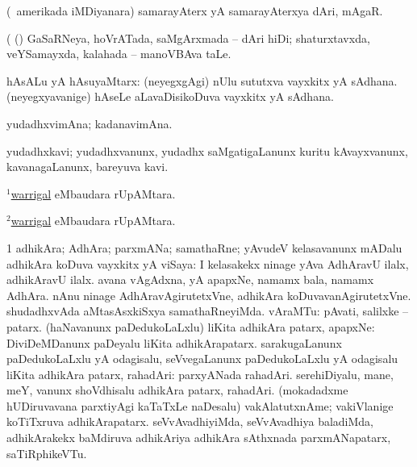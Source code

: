 \bentry
{} 
\gl{\nA}
\expl{}
\bmng
(\kanu\ amerikada iMDiyanara) samarayAterx yA samarayAterxya dAri, mAgaR. 
\emng

\noindent 
\gl{\pagu}
\expl{}
\bmng
{} (  (\rUpa) GaSaRNeya, hoVrATada, saMgArxmada -- dAri hiDi; shaturxtavxda, veYSamayxda, kalahada -- manoVBAva taLe. 
\emng
\eentry

\bentry
{} 
\gl{\nA}
\expl{}
\bmng
hAsALu yA hAsuyaMtarx: 
\banum
{} (neyegxgAgi) nUlu sututxva vayxkitx yA sAdhana. 
 (neyegxyavanige) hAseLe aLavaDisikoDuva vayxkitx yA sAdhana. 
\eanum
\emng
\eentry

\bentry
{} 
\gl{\nA}
\expl{}
\bmng
yudadhxvimAna; kadanavimAna. 
\emng
\eentry

\bentry
{} 
\gl{\nA}
\expl{}
\bmng
yudadhxkavi; yudadhxvanunx, yudadhx saMgatigaLanunx kuritu kAvayxvanunx, kavanagaLanunx, bareyuva kavi. 
\emng
\eentry

\bentry
{} 
\gl{\nA}
\expl{}
\bmng
\hyperlink{warrigal(1)}{$^1$warrigal} eMbaudara rUpAMtara. 
\emng
\eentry

\bentry
{} 
\gl{\gu}
\expl{}
\bmng
\hyperlink{warrigal(2)}{$^2$warrigal} eMbaudara rUpAMtara. 
\emng
\eentry

\bentry
{} 
\gl{\nA}
\expl{}
\bmng
\bnum
\num{1} adhikAra; AdhAra; parxmANa; samathaRne; yAvudeV kelasavanunx mADalu adhikAra koDuva vayxkitx yA viSaya:  I kelasakekx ninage yAva AdhAravU ilalx, adhikAravU ilalx.  avana vAgAdxna, yA apapxNe, namamx bala, namamx AdhAra.  nAnu ninage AdhAravAgirutetxVne, adhikAra koDuvavanAgirutetxVne.  shudadhxvAda aMtasAsxkiSxya samathaRneyiMda. 
 vAraMTu: 
\banum
{} pAvati, salilxke -- patarx. 
 (haNavanunx paDedukoLaLxlu) liKita adhikAra patarx, apapxNe:  DiviDeMDanunx paDeyalu liKita adhikArapatarx. 
 sarakugaLanunx paDedukoLaLxlu yA odagisalu, seVvegaLanunx paDedukoLaLxlu yA odagisalu liKita adhikAra patarx, rahadAri:  parxyANada rahadAri. 
 serehiDiyalu, mane, meY, \mo vanunx shoVdhisalu adhikAra patarx, rahadAri. 
 (mokadadxme hUDiruvavana parxtiyAgi kaTaTxLe naDesalu) vakAlatutxnAme; vakiVlanige koTiTxruva adhikArapatarx. 
 seVvAvadhiyiMda, seVvAvadhiya baladiMda, adhikArakekx baMdiruva adhikAriya adhikAra sAthxnada parxmANapatarx, saTiRphikeVTu. 
\eanum
\numie
\enum
\emng
\eentry


